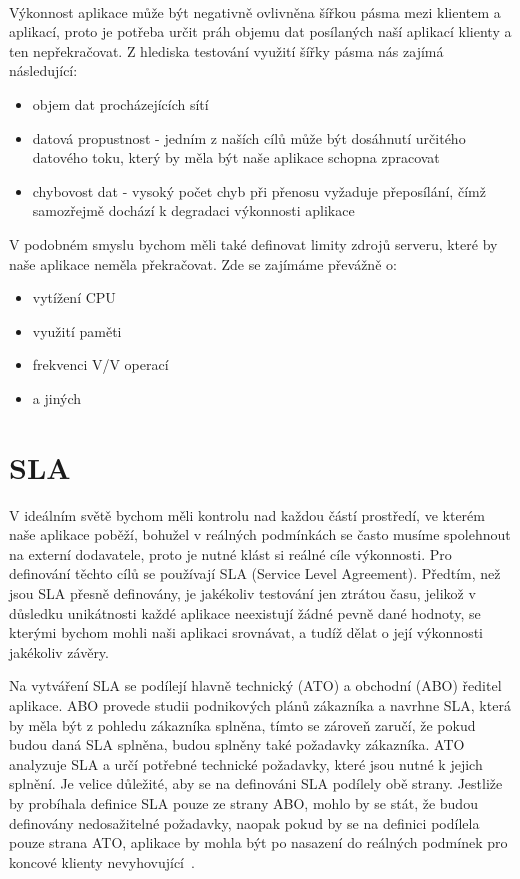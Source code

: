 \documentclass[122pt,oneside]{fithesis}
\begin{document}
\vspace{5 mm}
\\\indent Výkonnost aplikace může být negativně ovlivněna šířkou pásma mezi klientem a aplikací, proto je potřeba určit práh objemu dat posílaných naší aplikací klienty a ten nepřekračovat. Z hlediska testování využití šířky pásma nás zajímá následující:
\begin{itemize}
  \item objem dat procházejících sítí
  \item datová propustnost - jedním z naších cílů může být dosáhnutí určitého datového toku, který by měla být naše aplikace schopna zpracovat
  \item chybovost dat - vysoký počet chyb při přenosu vyžaduje přeposílání, čímž samozřejmě dochází k degradaci výkonnosti aplikace
\end{itemize}
V podobném smyslu bychom měli také definovat limity zdrojů serveru, které by naše aplikace neměla překračovat. Zde se zajímáme převážně o:
\begin{itemize}
  \item vytížení CPU
  \item využití paměti
  \item frekvenci V/V operací
  \item a jiných
\end{itemize}

\section{SLA}
V ideálním světě bychom měli kontrolu nad každou částí prostředí, ve kterém naše aplikace poběží, bohužel v reálných podmínkách se často musíme spolehnout na externí dodavatele, proto je nutné klást si reálné cíle výkonnosti. Pro definování těchto cílů se používají SLA (Service Level Agreement). Předtím, než jsou SLA přesně definovány, je jakékoliv testování jen ztrátou času, jelikož v důsledku unikátnosti každé aplikace neexistují žádné pevně dané hodnoty, se kterými bychom mohli naši aplikaci srovnávat, a tudíž dělat o její výkonnosti jakékoliv závěry.

Na vytváření SLA se podílejí hlavně technický (ATO) a obchodní (ABO) ředitel aplikace. ABO provede studii podnikových plánů zákazníka a navrhne SLA, která by měla být z pohledu zákazníka splněna, tímto se zároveň zaručí, že pokud budou daná SLA splněna, budou splněny také požadavky zákazníka. ATO analyzuje SLA a určí potřebné technické požadavky, které jsou nutné k jejich splnění. Je velice důležité, aby se na definováni SLA podílely obě strany. Jestliže by probíhala definice SLA pouze ze strany ABO, mohlo by se stát, že budou definovány nedosažitelné požadavky, naopak pokud by se na definici podílela pouze strana ATO, aplikace by mohla být po nasazení do reálných podmínek pro koncové klienty nevyhovující~\cite{haines06}.
\end{document}
